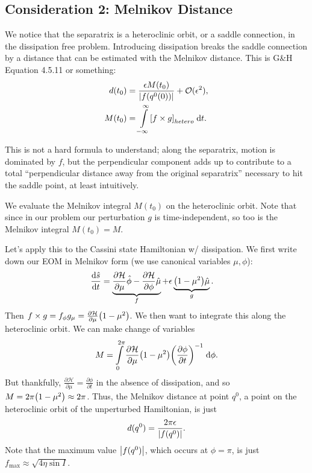 \documentclass[11pt,
        usenames, %
        dvipsnames %
    ]{article}
\newcommand*{\rd}[2]{\frac{\mathrm{d}#1}{\mathrm{d}#2}}
\newcommand*{\pd}[2]{\frac{\partial#1}{\partial#2}}
\DeclarePairedDelimiter\abs{\lvert}{\rvert}
\DeclarePairedDelimiter\p{\lparen}{\rparen}
\DeclarePairedDelimiter\s{\lbrack}{\rbrack}
\begin{document}
\subsection{Consideration 2: Melnikov Distance}

We notice that the separatrix is a heteroclinic orbit, or a saddle connection,
in the dissipation free problem. Introducing dissipation breaks the saddle
connection by a distance that can be estimated with the Melnikov distance. This
is G\&H Equation 4.5.11 or something:
\begin{align}
    d(t_0) &= \frac{\epsilon M(t_0)}{\abs*{f(q^0(0))}} + \mathcal{O}(\epsilon^2)
        ,\\
    M(t_0) &= \int\limits_{-\infty}^\infty
        \s*{f \times g}_{hetero}\;\mathrm{d}t.
\end{align}

This is not a hard formula to understand; along the separatrix, motion is
dominated by $f$, but the perpendicular component adds up to contribute to a
total ``perpendicular distance away from the original separatrix'' necessary to
hit the saddle point, at least intuitively.

We evaluate the Melnikov integral $M(t_0)$ on the heteroclinic orbit. Note that
since in our problem our perturbation $g$ is time-independent, so too is the
Melnikov integral $M(t_0) = M$.

Let's apply this to the Cassini state Hamiltonian w/ dissipation. We first write
down our EOM in Melnikov form (we use canonical variables $\mu, \phi$):
\begin{align}
    \rd{\hat{s}}{t}
        &= \underbrace{
            \pd{\mathcal{H}}{\mu}\hat{\phi} - \pd{\mathcal{H}}{\phi}\hat{\mu}}_f
            + \epsilon \underbrace{\p*{1 - \mu^2}\hat{\mu}}_g.
\end{align}
Then $f \times g = f_\phi g_\mu = \pd{\mathcal{H}}{\mu}\p*{1 - \mu^2}$. We then
want to integrate this along the heteroclinic orbit. We can make change of
variables
\begin{equation}
    M = \int\limits_0^{2\pi}\pd{\mathcal{H}}{\mu}
        \p*{1 - \mu^2}\p*{\pd{\phi}{t}}^{-1}\;\mathrm{d}\phi.
\end{equation}
But thankfully, $\pd{\mathcal{H}}{\mu} = \pd{\phi}{t}$ in the absence of
dissipation, and so $M = 2\pi\p*{1 - \mu^2} \approx 2\pi$.
Thus, the Melnikov distance at point $q^0$, a point on the heteroclinic
orbit of the unperturbed Hamiltonian, is just
\begin{equation}
    d(q^0) = \frac{2\pi \epsilon}{\abs*{f(q^0)}}.
\end{equation}
Note that the maximum value $\abs*{f(q^0)}$, which occurs at $\phi = \pi$, is
just $f_{\max} \approx \sqrt{4\eta \sin I}$.
\end{document}
